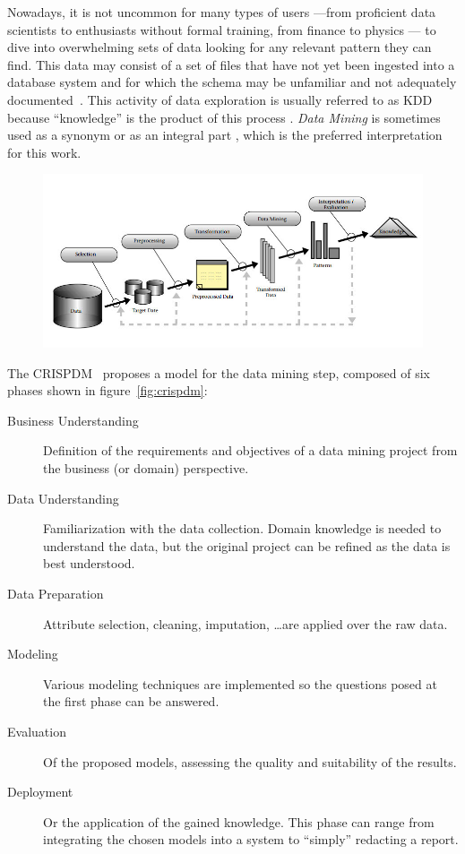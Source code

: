 
Nowadays, it is not uncommon for many types of users
---from proficient data scientists to enthusiasts without formal
training, from finance to physics --- to dive into overwhelming
sets of data looking for any relevant pattern they can find. This data
may consist of a set of files that have not yet been ingested into a
database system and for which the schema may be unfamiliar and not
adequately documented~\cite{hey2009the}.
This activity of data exploration is usually referred to as \gls{KDD}
because ``knowledge'' is the product of this process
\parencite{Piatetsky-Shapiro1991,Fayyad1996a}.
\emph{Data Mining} is sometimes used as a synonym or as an integral
part \parencite{Fayyad1996a,Reinartz1999}, which is
the preferred interpretation for this work.

\begin{figure}[htbp]
    \centering
    \includegraphics[width=\linewidth]{images/1_introduction/kdd.jpg}
    \caption{}
    \label{fig:kdd}
\end{figure}

The \gls{CRISPDM}~\cite{Shearer2000} proposes a model for the data
mining step, composed of six phases shown in figure~\ref{fig:crispdm}:

\begin{description}
    \item[Business Understanding] Definition of the requirements and objectives of a data mining project
        from the business (or domain) perspective.
    \item[Data Understanding] Familiarization with the data collection. Domain knowledge
        is needed to understand the data, but the original project can be refined as the data is best understood.
    \item[Data Preparation] Attribute selection, cleaning, imputation, \ldots are applied over the raw data.
    \item[Modeling] Various modeling techniques are implemented so the questions posed at the first phase
        can be answered.
    \item[Evaluation] Of the proposed models, assessing the quality and suitability of the results.
    \item[Deployment] Or the application of the gained knowledge. This phase can range from integrating
    the chosen models into a system to ``simply'' redacting a report.
\end{description}


